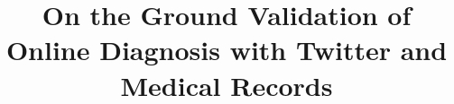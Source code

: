 \documentclass{sig-alternate-2013}
\begin{document}
\title{On the Ground Validation of Online Diagnosis with Twitter and Medical Records}

%
%
%
%
%
\end{document}
